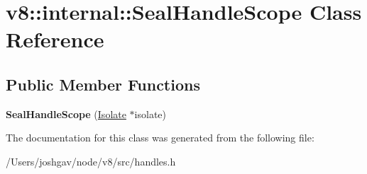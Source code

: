 \hypertarget{classv8_1_1internal_1_1_seal_handle_scope}{}\section{v8\+:\+:internal\+:\+:Seal\+Handle\+Scope Class Reference}
\label{classv8_1_1internal_1_1_seal_handle_scope}
\subsection*{Public Member Functions}
\begin{DoxyCompactItemize}
\item 
{\bfseries Seal\+Handle\+Scope} (\hyperlink{classv8_1_1internal_1_1_isolate}{Isolate} $\ast$isolate)\hypertarget{classv8_1_1internal_1_1_seal_handle_scope_a0da7b60b2fb11fee0ff7c36942537ac6}{}\label{classv8_1_1internal_1_1_seal_handle_scope_a0da7b60b2fb11fee0ff7c36942537ac6}

\end{DoxyCompactItemize}


The documentation for this class was generated from the following file\+:\begin{DoxyCompactItemize}
\item 
/\+Users/joshgav/node/v8/src/handles.\+h\end{DoxyCompactItemize}
